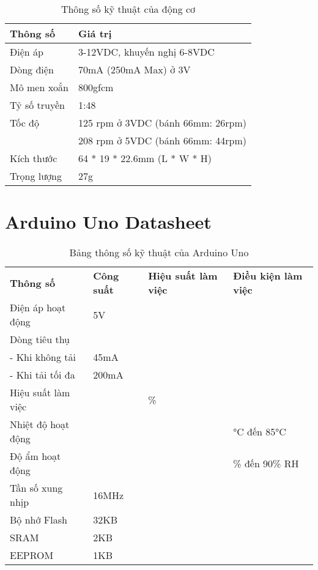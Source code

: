 \begin{table}[h]
    \centering
    \begin{tabular}{|l|l|}
    \hline
    \textbf{Thông số} & \textbf{Giá trị} \\ \hline
    Điện áp & 3-12VDC, khuyến nghị 6-8VDC \\ \hline
    Dòng điện & 70mA (250mA Max) ở 3V \\ \hline
    Mô men xoắn & 800gfcm \\ \hline
    Tỷ số truyền & 1:48 \\ \hline
    Tốc độ & 125 rpm ở 3VDC (bánh 66mm: 26rpm) \\
     & 208 rpm ở 5VDC (bánh 66mm: 44rpm) \\ \hline
    Kích thước & 64 * 19 * 22.6mm (L * W * H) \\ \hline
    Trọng lượng & 27g \\ \hline
    \end{tabular}
    \caption{Thông số kỹ thuật của động cơ}
    \label{tab:motor_specs}
    \end{table}





    \section*{Arduino Uno Datasheet}

    \begin{table}[h!]
    \centering
    \begin{tabular}{|>{\raggedright\arraybackslash}p{4cm}|>{\raggedright\arraybackslash}p{3cm}|>{\raggedright\arraybackslash}p{3cm}|>{\raggedright\arraybackslash}p{4cm}|}
    \hline
    \multicolumn{4}{|c|}{\textbf{Thông số kỹ thuật của Arduino Uno}} \\
    \hline
    \textbf{Thông số} & \textbf{Công suất} & \textbf{Hiệu suất làm việc} & \textbf{Điều kiện làm việc} \\
    \hline
    Điện áp hoạt động & 5V &  &  \\
    \hline
    Dòng tiêu thụ &  &  &  \\
    - Khi không tải & 45mA &  &  \\
    - Khi tải tối đa & 200mA &  &  \\
    \hline
    Hiệu suất làm việc &  & 98\% &  \\
    \hline
    Nhiệt độ hoạt động &  &  & -40°C đến 85°C \\
    \hline
    Độ ẩm hoạt động &  &  & 0\% đến 90\% RH \\
    \hline
    Tần số xung nhịp & 16MHz &  &  \\
    \hline
    Bộ nhớ Flash & 32KB &  &  \\
    \hline
    SRAM & 2KB &  &  \\
    \hline
    EEPROM & 1KB &  &  \\
    \hline
    \end{tabular}
    \caption{Bảng thông số kỹ thuật của Arduino Uno}
    \label{tab:arduino_uno}
    \end{table}


